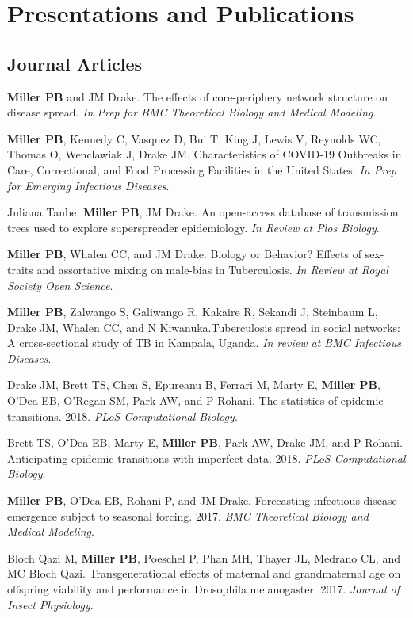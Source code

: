 \documentclass[letterpaper]{article}
\renewenvironment{itemize}{
  \begin{list}{}{
    \setlength{\leftmargin}{1.5em}
  }
}{
  \end{list}
}
\begin{document}
\section*{Presentations and Publications}

\subsection*{Journal Articles}

\begin{itemize}
\item    \textbf{Miller PB} and JM Drake. The effects of core-periphery network structure on disease spread. \textit{In Prep for BMC Theoretical Biology and Medical Modeling}. 
\item    \textbf{Miller PB}, Kennedy C, Vasquez D, Bui T, King J, Lewis V, Reynolds WC, Thomas O,  Wenclawiak J, Drake JM. Characteristics of COVID-19 Outbreaks in Care, Correctional, and Food Processing Facilities in the United States. \textit{In Prep for Emerging Infectious Diseases}. 
\item  Juliana Taube, \textbf{Miller PB}, JM Drake. An open-access database of transmission trees used to explore superspreader epidemiology. \textit{In Review at Plos Biology}. 
\item    \textbf{Miller PB},  Whalen CC, and JM Drake. Biology or Behavior? Effects of sex-traits and assortative mixing on male-bias in Tuberculosis. \textit{In Review at Royal Society Open Science}. 
\item   \textbf{Miller PB}, Zalwango S, Galiwango R, Kakaire R, Sekandi J, Steinbaum L, Drake JM, Whalen CC, and N Kiwanuka.Tuberculosis spread in social networks: A cross-sectional study of TB in Kampala, Uganda. \textit{In review at BMC Infectious Diseases}. 
\item Drake JM, Brett TS,  Chen S, Epureanu B, Ferrari M, Marty E, \textbf{Miller PB}, O'Dea EB, O'Regan SM, Park AW, and P Rohani. The statistics of epidemic transitions. 2018. \textit{PLoS Computational Biology}. 
\item Brett TS,  O'Dea EB, Marty E, \textbf{Miller PB}, Park AW, Drake JM, and P Rohani. Anticipating epidemic transitions with imperfect data. 2018. \textit{PLoS Computational Biology}. 
\item \textbf{Miller PB}, O'Dea EB, Rohani P, and JM Drake. Forecasting infectious disease emergence subject to seasonal forcing. 2017. \textit{BMC Theoretical Biology and Medical Modeling}.
\item Bloch Qazi M, \textbf{Miller PB}, Poeschel P, Phan MH, Thayer JL, Medrano CL, and MC Bloch Qazi. Transgenerational effects of maternal and grandmaternal age on offspring viability and performance in Drosophila melanogaster. 2017. \textit{Journal of Insect Physiology}.

\end{itemize}
\end{document}
